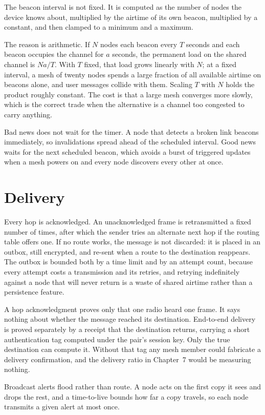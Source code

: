 \documentclass[12pt,a4paper,oneside]{report}
\begin{document}
The beacon interval is not fixed. It is computed as the number of nodes the
device knows about, multiplied by the airtime of its own beacon, multiplied by a
constant, and then clamped to a minimum and a maximum.

The reason is arithmetic. If $N$ nodes each beacon every $T$ seconds and each
beacon occupies the channel for $a$ seconds, the permanent load on the shared
channel is $N a / T$. With $T$ fixed, that load grows linearly with $N$; at a
fixed interval, a mesh of twenty nodes spends a large fraction of all available
airtime on beacons alone, and user messages collide with them. Scaling $T$ with
$N$ holds the product roughly constant. The cost is that a large mesh converges
more slowly, which is the correct trade when the alternative is a channel too
congested to carry anything.

Bad news does not wait for the timer. A node that detects a broken link beacons
immediately, so invalidations spread ahead of the scheduled interval. Good news
waits for the next scheduled beacon, which avoids a burst of triggered updates
when a mesh powers on and every node discovers every other at once.

\section{Delivery}

Every hop is acknowledged. An unacknowledged frame is retransmitted a fixed
number of times, after which the sender tries an alternate next hop if the
routing table offers one. If no route works, the message is not discarded: it is
placed in an outbox, still encrypted, and re-sent when a route to the destination
reappears. The outbox is bounded both by a time limit and by an attempt count,
because every attempt costs a transmission and its retries, and retrying
indefinitely against a node that will never return is a waste of shared airtime
rather than a persistence feature.

A hop acknowledgment proves only that one radio heard one frame. It says nothing
about whether the message reached its destination. End-to-end delivery is proved
separately by a receipt that the destination returns, carrying a short
authentication tag computed under the pair's session key. Only the true
destination can compute it. Without that tag any mesh member could fabricate a
delivery confirmation, and the delivery ratio in Chapter~7 would be measuring
nothing.

Broadcast alerts flood rather than route. A node acts on the first copy it sees
and drops the rest, and a time-to-live bounds how far a copy travels, so each
node transmits a given alert at most once.
\end{document}
